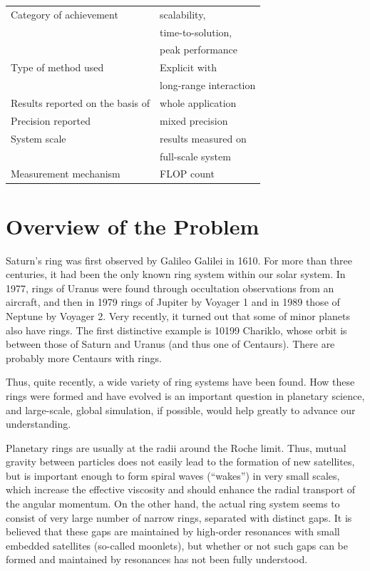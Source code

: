 \documentclass[conference]{IEEEtran}
\begin{document}
  \begin{tabular}{ll}
    \hline
    Category of achievement&  scalability,\\
                            &time-to-solution,\\
                           &peak performance\\
    Type of method used & Explicit with\\
                        &long-range interaction\\    
    Results reported on the basis of&  whole application\\
     Precision reported &  mixed precision\\
     System scale & results measured on \\
                  &full-scale system\\
    Measurement mechanism &   FLOP count\\

 \hline
\end{tabular}

  \section{Overview of the Problem}
  \label{sect:overview}


  

Saturn's ring was first observed by Galileo Galilei in 1610. For more
than three centuries, it had been the only known ring system within
our solar system. In 1977, rings of Uranus were found through
occultation observations from an aircraft, and then in 1979 rings of
Jupiter by Voyager 1 and in 1989 those of Neptune by Voyager 2.  Very
recently, it turned out that some of minor planets also have
rings. The first distinctive example is 10199 Chariklo, whose orbit is
between those of Saturn and Uranus (and thus one of Centaurs). There
are probably more Centaurs with rings.

Thus, quite recently, a wide variety of ring systems have been found.
How these rings were formed and have evolved is an important question
in planetary science, and large-scale, global simulation, if possible,
would help greatly to advance our understanding.

Planetary rings are usually at the radii around the Roche limit. Thus,
mutual gravity between particles does not easily lead to the formation
of new satellites, but is important enough to form spiral waves
(``wakes'') in very small scales, which increase the effective
viscosity and should enhance the radial transport of the angular
momentum. On the other hand, the actual ring system seems to consist
of very large number of narrow rings, separated with distinct gaps. It
is believed that these gaps are maintained by high-order resonances
with small embedded satellites (so-called moonlets), but whether or
not such gaps can be formed and maintained by resonances has not been
fully understood.
\end{document}
